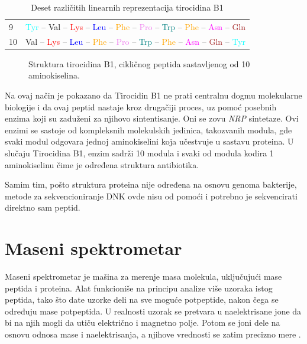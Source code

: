 \documentclass[12pt,oneside]{memoir}
\begin{document}
\begin{table}[h]
\begin{tabular}{ll}
9 & \textcolor{cyan}{Tyr} – \textcolor{green!70!black}{Val} – \textcolor{red}{Lys} – \textcolor{blue}{Leu} – \textcolor{orange}{Phe} – \textcolor{violet}{Pro} – \textcolor{teal}{Trp} – \textcolor{orange}{Phe} – \textcolor{magenta}{Asn} – \textcolor{brown}{Gln} \\
10 & \textcolor{green!70!black}{Val} – \textcolor{red}{Lys} – \textcolor{blue}{Leu} – \textcolor{orange}{Phe} – \textcolor{violet}{Pro} – \textcolor{teal}{Trp} – \textcolor{orange}{Phe} – \textcolor{magenta}{Asn} – \textcolor{brown}{Gln} – \textcolor{cyan}{Tyr} \\
\bottomrule
\end{tabular}
\caption{Deset različitih linearnih reprezentacija tirocidina B1}
\label{tab:linear_representations}
\end{table}

\begin{figure}[h]
  \centering
  
  \caption{Struktura tirocidina B1, cikličnog peptida sastavljenog od 10 aminokiselina.}
  \label{fig:tirocidin}
\end{figure}

Na ovaj način je pokazano da Tirocidin B1 ne prati centralnu dogmu molekularne biologije i da ovaj peptid nastaje kroz drugačiji proces, uz pomoć posebnih enzima koji su zaduženi za njihovo sintentisanje. Oni se zovu \emph{NRP} sintetaze. Ovi enzimi se sastoje od kompleksnih molekulskih jedinica, takozvanih modula, gde svaki modul odgovara jednoj aminokiselini koja učestvuje u sastavu proteina. U slučaju Tirocidina B1, enzim sadrži 10 modula i svaki od modula kodira 1 aminokiselinu čime je određena struktura antibiotika.

Samim tim, pošto struktura proteina nije određena na osnovu genoma bakterije, metode za sekvencioniranje DNK ovde nisu od pomoći i potrebno je sekvencirati direktno sam peptid.

\section{Maseni spektrometar}
Maseni spektrometar je mašina za merenje masa molekula, uključujući mase peptida i proteina. Alat funkcioniše na principu analize više uzoraka istog peptida, tako što date uzorke deli na sve moguće potpeptide, nakon čega se određuju mase potpeptida. U realnosti uzorak se pretvara u naelektrisane jone da bi na njih mogli da utiču električno i magnetno polje. Potom se joni dele na osnovu odnosa mase i naelektrisanja, a njihove vrednosti se zatim precizno mere \cite{spectrometer}.
\end{document}
